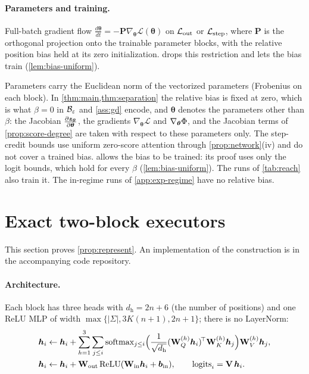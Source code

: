 \paragraph{Parameters and training.}

\begin{assumption}[Training]
\label{ass:gd}
Full-batch gradient flow $\tfrac{d\bm\theta}{dt}=-\mathbf P\nabla_{\bm\theta}\mathcal L(\bm\theta)$ on $\mathcal L_{\mathrm{out}}$ or $\mathcal L_{\mathrm{step}}$, where $\mathbf P$ is the orthogonal projection onto
the trainable parameter blocks, with the relative
position bias held at its zero initialization.  drops this restriction and lets the bias train (\cref{lem:bias-uniform}).
\end{assumption}

\label{rem:norms}Parameters carry the Euclidean norm of the vectorized parameters (Frobenius on
each block). In \cref{thm:main,thm:separation} the relative bias is fixed at zero, which is what $\beta=0$ in $\mathcal B_{\varepsilon}$ and
\cref{ass:gd} encode, and $\bm\theta$ denotes the parameters other than $\beta$: the Jacobian $\Jz$, the gradients $\nabla_{\bm\theta}\mathcal L$ and
$\nabla_{\bm\theta}\Phi$, and the Jacobian terms of \cref{prop:score-degree} are taken with respect to these parameters only. The step-credit bounds use uniform
zero-score attention through \cref{prop:network}(iv) and do not cover a trained bias.  allows the bias to be
trained: its proof uses only the logit bounds, which hold for every $\beta$ (\cref{lem:bias-uniform}). The runs of \cref{tab:reach} also train it. The in-regime runs of \cref{app:exp-regime} have no relative bias.


\section{Exact two-block executors}
\label{app:architectures}

This section proves \cref{prop:represent}. An implementation of the construction is in the accompanying code repository.

\paragraph{Architecture.}
\label{app:construction}
\label{app:model}
Each block has three heads with $d_{\mathrm h}=2n+6$ (the number of positions) and one ReLU MLP of width $\max\{|\Sigma|,3K(n+1),2n+1\}$;
there is no LayerNorm:
\begin{align*}
 \bm h_i&\leftarrow \bm h_i+\sum_{h=1}^{3}\sum_{j\le i}\operatorname{softmax}_{j\le i}\Bigl(\tfrac{1}{\sqrt{d_{\mathrm h}}}(\mathbf W^{(h)}_Q\bm h_i)^{\!\top}\mathbf W^{(h)}_K\bm h_j\Bigr)\mathbf W^{(h)}_V\bm h_j,\\
 \bm h_i&\leftarrow \bm h_i+\mathbf W_{\mathrm{out}}\relu(\mathbf W_{\mathrm{in}}\bm h_i+\bm b_{\mathrm{in}}),\qquad \mathrm{logits}_i=\mathbf V\,\bm h_i .
\end{align*}

